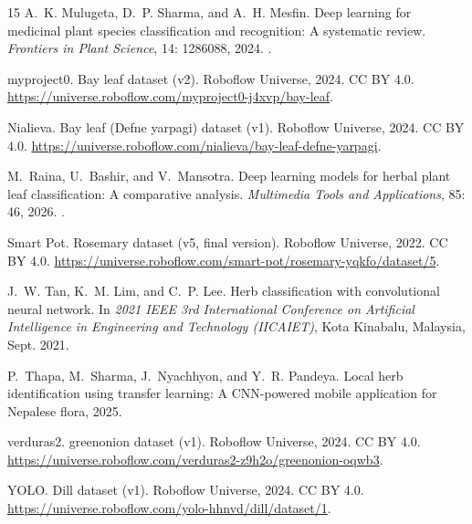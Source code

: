 \documentclass[final]{article}
\begin{document}
\begin{thebibliography}{15}
A.~K. Mulugeta, D.~P. Sharma, and A.~H. Mesfin.
\newblock Deep learning for medicinal plant species classification and
  recognition: A systematic review.
\newblock \emph{Frontiers in Plant Science}, 14: 1286088, 2024.
\newblock {}.

{myproject0}.
\newblock Bay leaf dataset (v2).
\newblock Roboflow Universe, 2024.
\newblock CC BY 4.0.
  \url{https://universe.roboflow.com/myproject0-j4xvp/bay-leaf}.

{Nialieva}.
\newblock Bay leaf ({Defne} yarpagi) dataset (v1).
\newblock Roboflow Universe, 2024.
\newblock CC BY 4.0.
  \url{https://universe.roboflow.com/nialieva/bay-leaf-defne-yarpagi}.

M.~Raina, U.~Bashir, and V.~Mansotra.
\newblock Deep learning models for herbal plant leaf classification: A
  comparative analysis.
\newblock \emph{Multimedia Tools and Applications}, 85: 46, 2026.
\newblock {}.

{Smart Pot}.
\newblock Rosemary dataset (v5, final version).
\newblock Roboflow Universe, 2022.
\newblock CC BY 4.0.
  \url{https://universe.roboflow.com/smart-pot/rosemary-yqkfo/dataset/5}.

J.~W. Tan, K.~M. Lim, and C.~P. Lee.
\newblock Herb classification with convolutional neural network.
\newblock In \emph{2021 IEEE 3rd International Conference on Artificial
  Intelligence in Engineering and Technology (IICAIET)}, Kota Kinabalu,
  Malaysia, Sept. 2021.

P.~Thapa, M.~Sharma, J.~Nyachhyon, and Y.~R. Pandeya.
\newblock Local herb identification using transfer learning: A {CNN}-powered
  mobile application for {Nepalese} flora, 2025.

{verduras2}.
\newblock greenonion dataset (v1).
\newblock Roboflow Universe, 2024.
\newblock CC BY 4.0.
  \url{https://universe.roboflow.com/verduras2-z9h2o/greenonion-oqwb3}.

{YOLO}.
\newblock Dill dataset (v1).
\newblock Roboflow Universe, 2024.
\newblock CC BY 4.0.
  \url{https://universe.roboflow.com/yolo-hhnvd/dill/dataset/1}.

\end{thebibliography}
\end{document}
